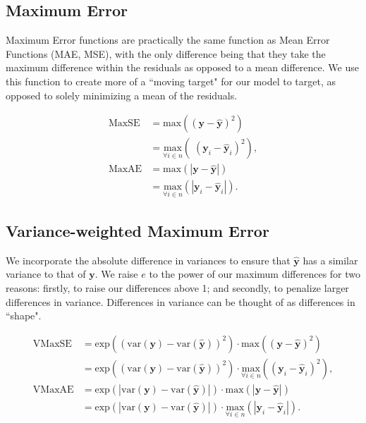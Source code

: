 \documentclass{article}
\begin{document}
\subsection{Maximum Error}

Maximum Error functions are practically the same function as Mean Error Functions (MAE, MSE), with the only difference being that they take the maximum difference within the residuals as opposed to a mean difference. We use this function to create more of a ``moving target" for our model to target, as opposed to solely minimizing a mean of the residuals.

\begin{align*}
    \text{MaxSE}
    &= \text{max} \left( \left( \mathbf{y} - \mathbf{\hat{y}} \right) ^2 \right) \\
    &= \underset{\forall i \in n}{\text{max}} \left( \; \left( \mathbf{y}_i - \mathbf{\hat{y}}_i \right)^2 \right),
    \\[30pt]
    \text{MaxAE}
    &= \text{max} \left( \left| \mathbf{y} - \mathbf{\hat{y}} \right| \right) \\
    &= \underset{\forall i \in n}{\text{max}} \left( \left| \mathbf{y}_i - \mathbf{\hat{y}}_i \right| \right).
\end{align*}

\subsection{Variance-weighted Maximum Error}

We incorporate the absolute difference in variances to ensure that \( \mathbf{\hat{y}} \) has a similar variance to that of \( \mathbf{y} \). We raise \( e \) to the power of our maximum differences for two reasons: firstly, to raise our differences above 1; and secondly, to penalize larger differences in variance. Differences in variance can be thought of as differences in ``shape".

\begin{align*}
    \text{VMaxSE}
    &= \text{exp} \left( \left( \text{var}(\mathbf{y}) - \text{var}(\hat{\mathbf{y}}) \right)^2 \right)
    \cdot \text{max} \left( \left( \mathbf{y} - \mathbf{\hat{y}} \right)^2 \right) \\
    &= \text{exp} \left( \left( \text{var} \left( \mathbf{y} \right) - \text{var} \left( \hat{\mathbf{y}} \right) \right)^2 \right)
    \cdot \underset{\forall i \in n}{\text{max}} \left( \left( \mathbf{y}_i - \mathbf{\hat{y}}_i \right)^2 \right) ,
    \\[30pt]
    \text{VMaxAE}
    &= \text{exp} \left( \left| \text{var}(\mathbf{y}) - \text{var}(\mathbf{\hat{y}}) \right| \right)
    \cdot \text{max}  \left( \left| \mathbf{y} - \mathbf{\hat{y}} \right| \right) \\
    &= \text{exp} \left( \left| \text{var}(\mathbf{y}) - \text{var} \left( \hat{\mathbf{y}} \right) \right| \right)
    \cdot \underset{\forall i \in n}{\text{max}} \left( \left| \mathbf{y}_i - \mathbf{\hat{y}}_i \right| \right) .
\end{align*}
\end{document}

